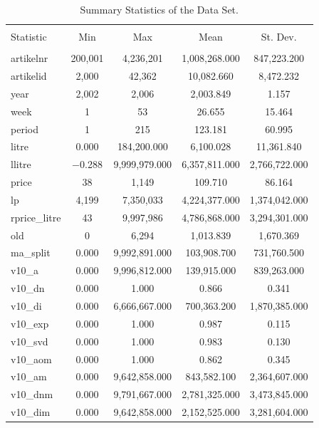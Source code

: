 \documentclass[11pt,]{article}
\begin{document}

\begin{table}[!htbp] \centering 
  \caption{Summary Statistics of the Data Set.} 
  \label{tab:SumStat} 
\begin{tabular}{@{\extracolsep{5pt}}lcccc} 
\\[-1.8ex]\hline 
\hline \\[-1.8ex] 
Statistic & \multicolumn{1}{c}{Min} & \multicolumn{1}{c}{Max} & \multicolumn{1}{c}{Mean} & \multicolumn{1}{c}{St. Dev.} \\ 
\hline \\[-1.8ex] 
artikelnr & 200,001 & 4,236,201 & 1,008,268.000 & 847,223.200 \\ 
artikelid & 2,000 & 42,362 & 10,082.660 & 8,472.232 \\ 
year & 2,002 & 2,006 & 2,003.849 & 1.157 \\ 
week & 1 & 53 & 26.655 & 15.464 \\ 
period & 1 & 215 & 123.181 & 60.995 \\ 
litre & 0.000 & 184,200.000 & 6,100.028 & 11,361.840 \\ 
llitre & $-$0.288 & 9,999,979.000 & 6,357,811.000 & 2,766,722.000 \\ 
price & 38 & 1,149 & 109.710 & 86.164 \\ 
lp & 4,199 & 7,350,033 & 4,224,377.000 & 1,374,042.000 \\ 
rprice\_litre & 43 & 9,997,986 & 4,786,868.000 & 3,294,301.000 \\ 
old & 0 & 6,294 & 1,013.839 & 1,670.369 \\ 
ma\_split & 0.000 & 9,992,891.000 & 103,908.700 & 731,760.500 \\ 
v10\_a & 0.000 & 9,996,812.000 & 139,915.000 & 839,263.000 \\ 
v10\_dn & 0.000 & 1.000 & 0.866 & 0.341 \\ 
v10\_di & 0.000 & 6,666,667.000 & 700,363.200 & 1,870,385.000 \\ 
v10\_exp & 0.000 & 1.000 & 0.987 & 0.115 \\ 
v10\_svd & 0.000 & 1.000 & 0.983 & 0.130 \\ 
v10\_aom & 0.000 & 1.000 & 0.862 & 0.345 \\ 
v10\_am & 0.000 & 9,642,858.000 & 843,582.100 & 2,364,607.000 \\ 
v10\_dnm & 0.000 & 9,791,667.000 & 2,781,325.000 & 3,473,845.000 \\ 
v10\_dim & 0.000 & 9,642,858.000 & 2,152,525.000 & 3,281,604.000 \\ 

\end{tabular}
\end{table}
\end{document}
